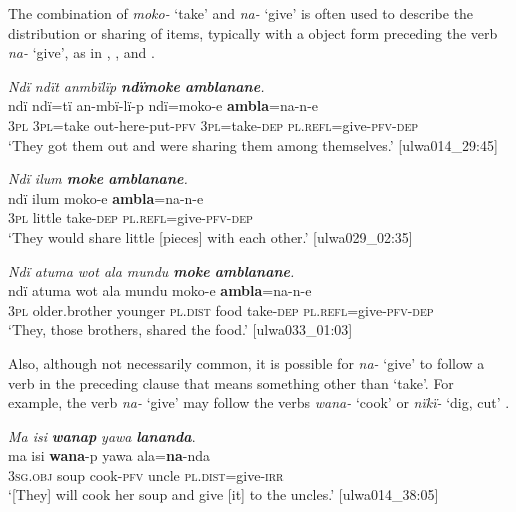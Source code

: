 The combination of \textit{moko-} ‘take’ and \textit{na-} ‘give’ is often used to describe the distribution or sharing of items, typically with a  object form preceding the verb \textit{na-} ‘give’, as in , , and .

\ea%
    \label{ex:clause:44}
          \textit{Ndï ndït anmbïlïp \textbf{ndïmoke} \textbf{amblanane}.}\\
\gll ndï  ndï=tï    an-mbï-lï-p    ndï=moko-e     \textbf{ambla}=na-n-e\\
    3\textsc{pl}  \textsc{3pl}=take  out-here-put-\textsc{pfv}  3\textsc{pl}=take-\textsc{dep}    \textsc{pl.refl}=give-\textsc{pfv-dep}\\
\glt `They got them out and were sharing them among themselves.’ [ulwa014\_29:45]
\z

\ea%
    \label{ex:clause:45}
          \textit{Ndï ilum \textbf{moke} \textbf{amblanane}.}\\
\gll ndï  ilum  moko-e  \textbf{ambla}=na-n-e\\
    \textsc{3pl}  little  take-\textsc{dep}  \textsc{pl.refl=}give-\textsc{pfv-dep}\\
\glt `They would share little [pieces] with each other.’ [ulwa029\_02:35]
\z

\ea%
    \label{ex:clause:46}\textbf{}
          \textit{Ndï atuma wot ala mundu \textbf{moke} \textbf{amblanane}.}\\
\gll ndï  atuma      wot    ala      mundu  moko-e  \textbf{ambla}=na-n-e\\
    3\textsc{pl}  older.brother  younger  \textsc{pl.dist}  food  take-\textsc{dep}  \textsc{pl.refl}=give-\textsc{pfv-dep}\\
\glt `They, those brothers, shared the food.’ [ulwa033\_01:03]
\z

Also, although not necessarily common, it is possible for \textit{na-} ‘give’ to follow a verb in the preceding clause that means something other than ‘take’. For example, the verb \textit{na-} ‘give’ may follow the verbs \textit{wana-} ‘cook’  or \textit{nïkï-} ‘dig, cut’ .

\ea%
    \label{ex:clause:47}
          \textit{Ma isi} \textbf{\textit{wanap}} \textit{yawa} \textbf{\textit{lananda}}.\\
\gll ma      isi    \textbf{wana}{}-p  yawa  ala=\textbf{na}{}-nda\\
    3\textsc{sg.obj}  soup  cook-\textsc{pfv}  uncle  \textsc{pl.dist}=give-\textsc{irr}\\
\glt `[They] will cook her soup and give [it] to the uncles.’ [ulwa014\_38:05]
\z

